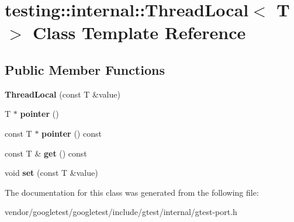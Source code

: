 \hypertarget{classtesting_1_1internal_1_1ThreadLocal}{}\section{testing\+:\+:internal\+:\+:Thread\+Local$<$ T $>$ Class Template Reference}
\label{classtesting_1_1internal_1_1ThreadLocal}
\subsection*{Public Member Functions}
\begin{DoxyCompactItemize}
\item 
{\bfseries Thread\+Local} (const T \&value)\hypertarget{classtesting_1_1internal_1_1ThreadLocal_a85610bdfdbc93a4c56215e0aad7da870}{}\label{classtesting_1_1internal_1_1ThreadLocal_a85610bdfdbc93a4c56215e0aad7da870}

\item 
T $\ast$ {\bfseries pointer} ()\hypertarget{classtesting_1_1internal_1_1ThreadLocal_a882f57fed4b074de83693c0c0fe62858}{}\label{classtesting_1_1internal_1_1ThreadLocal_a882f57fed4b074de83693c0c0fe62858}

\item 
const T $\ast$ {\bfseries pointer} () const \hypertarget{classtesting_1_1internal_1_1ThreadLocal_af4b33c12fd2da7d43d8654feccca77f7}{}\label{classtesting_1_1internal_1_1ThreadLocal_af4b33c12fd2da7d43d8654feccca77f7}

\item 
const T \& {\bfseries get} () const \hypertarget{classtesting_1_1internal_1_1ThreadLocal_a9cfa47ae6e9e8c19fe8782e2e9c1b13e}{}\label{classtesting_1_1internal_1_1ThreadLocal_a9cfa47ae6e9e8c19fe8782e2e9c1b13e}

\item 
void {\bfseries set} (const T \&value)\hypertarget{classtesting_1_1internal_1_1ThreadLocal_ab5ebc7ba07426cef7167afa2a7707eb4}{}\label{classtesting_1_1internal_1_1ThreadLocal_ab5ebc7ba07426cef7167afa2a7707eb4}

\end{DoxyCompactItemize}


The documentation for this class was generated from the following file\+:\begin{DoxyCompactItemize}
\item 
vendor/googletest/googletest/include/gtest/internal/gtest-\/port.\+h\end{DoxyCompactItemize}
